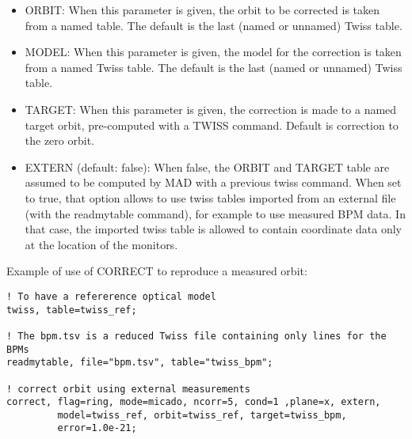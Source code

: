 \begin{itemize}
   \item ORBIT: When this parameter is given, the orbit to be corrected
     is taken from a named table. The default is the last (named or
     unnamed) Twiss table.  

   \item MODEL: When this parameter is given, the model for the
     correction is taken from a named Twiss table. The default is the
     last (named or unnamed) Twiss table.  

   \item TARGET: When this parameter is given, the correction is made to
     a named target orbit, pre-computed with a TWISS command. Default is
     correction to the zero orbit.  

   \item EXTERN (default: false): When false, the ORBIT and TARGET table
     are assumed to be computed by MAD with a previous twiss
     command. When set to true, that option allows to use twiss tables
     imported from an external file (with the readmytable command), for
     example to use measured BPM data. In that case, the imported twiss
     table is allowed to contain coordinate data only at the location of
     the monitors.  
\end{itemize}

Example of use of CORRECT to reproduce a measured orbit: 
\begin{verbatim}
! To have a refererence optical model
twiss, table=twiss_ref;

! The bpm.tsv is a reduced Twiss file containing only lines for the BPMs
readmytable, file="bpm.tsv", table="twiss_bpm";

! correct orbit using external measurements
correct, flag=ring, mode=micado, ncorr=5, cond=1 ,plane=x, extern,
         model=twiss_ref, orbit=twiss_ref, target=twiss_bpm, 
         error=1.0e-21;
\end{verbatim}


